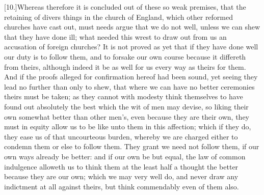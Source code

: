 [10.]Whereas therefore it is concluded out of these so weak premises, that the retaining of divers things in the church of England, which other reformed churches have cast out, must needs argue that we do not well, unless we can shew that they have done ill; what needed this wrest to  draw out from us an accusation of foreign churches? It is not proved as yet that if they have done well our duty is to follow them, and to forsake our own course because it differeth from theirs, although indeed it be as well for us every way as theirs for them. And if the proofs alleged for confirmation hereof had been sound, yet seeing they lead no further than only to shew, that where we can have no better ceremonies theirs must be taken; as they cannot with modesty think themselves to have found out absolutely the best which the wit of men may devise, so liking their own somewhat better than other men’s, even because they are their own, they must in equity allow us to be like unto them in this affection; which if they do, they ease us of that uncourteous burden, whereby we are charged either to condemn them or else to follow them. They grant we need not follow them, if our own ways already be better: and if our own be but equal, the law of common indulgence alloweth us to think them at the least half a thought the better because they are our own; which we may very well do, and never draw any indictment at all against theirs, but think commendably even of them also.

